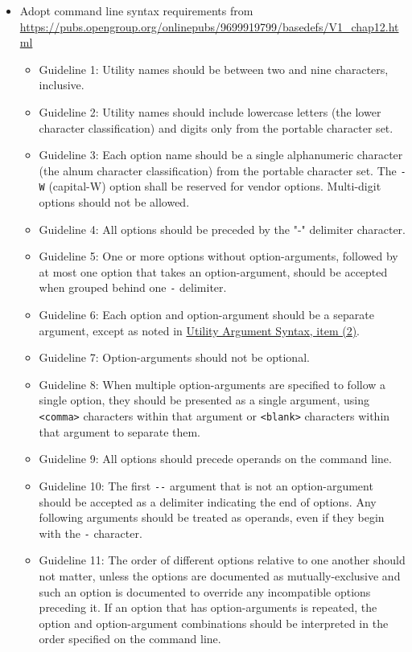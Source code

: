 \documentclass[]{nrel}
\begin{document}
\begin{itemize}
\item Adopt command line syntax requirements from \url{https://pubs.opengroup.org/onlinepubs/9699919799/basedefs/V1\_chap12.html}
\begin{itemize}
\item Guideline 1: Utility names should be between two and nine characters, inclusive.
\item Guideline 2: Utility names should include lowercase letters (the lower character classification) and digits only from the portable character set.
\item Guideline 3: Each option name should be a single alphanumeric character (the alnum character classification) from the portable character set. The \lstinline{-W} (capital-W) option shall be reserved for vendor options. Multi-digit options should not be allowed.
\item Guideline 4: All options should be preceded by the "-" delimiter character.
\item Guideline 5: One or more options without option-arguments, followed by at most one option that takes an option-argument, should be accepted when grouped behind one \lstinline{-} delimiter.
\item Guideline 6: Each option and option-argument should be a separate argument, except as noted in \href{https://pubs.opengroup.org/onlinepubs/9699919799/basedefs/V1\_chap12.html}{Utility Argument Syntax, item (2)}.
\item Guideline 7: Option-arguments should not be optional.
\item Guideline 8: When multiple option-arguments are specified to follow a single option, they should be presented as a single argument, using \lstinline{<comma>} characters within that argument or \lstinline{<blank>} characters within that argument to separate them.
\item Guideline 9: All options should precede operands on the command line.
\item Guideline 10: The first \lstinline{--} argument that is not an option-argument should be accepted as a delimiter indicating the end of options. Any following arguments should be treated as operands, even if they begin with the \lstinline{-} character.
\item Guideline 11: The order of different options relative to one another should not matter, unless the options are documented as mutually-exclusive and such an option is documented to override any incompatible options preceding it. If an option that has option-arguments is repeated, the option and option-argument combinations should be interpreted in the order specified on the command line.

\end{itemize}
\end{itemize}
\end{document}
